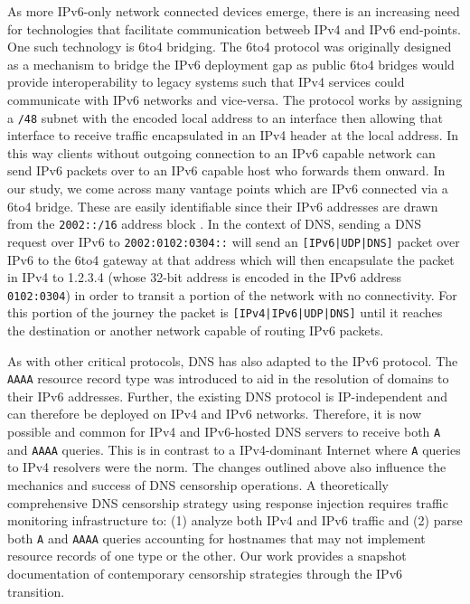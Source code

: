 As more IPv6-only network connected devices emerge, there is an increasing need
for technologies that facilitate communication betweeb IPv4 and IPv6
end-points. One such technology is 6to4 bridging. The 6to4 protocol was
originally designed as a mechanism to bridge the IPv6 deployment gap as public
6to4 bridges would provide interoperability to legacy systems such that IPv4
services could communicate with IPv6 networks and vice-versa. The protocol
works by assigning a \texttt{/48} subnet with the encoded local address to an
interface then allowing that interface to receive traffic encapsulated in an
IPv4 header at the local address. In this way clients without outgoing
connection to an IPv6 capable network can send IPv6 packets over to an IPv6
capable host who forwards them onward. In our study, we come across many
vantage points which are IPv6 connected via a 6to4 bridge. These are easily
identifiable since their IPv6 addresses are drawn from the \texttt{2002::/16}
address block \cite{RFC3056}.
%
In the context of DNS, sending a DNS request over IPv6 to
\texttt{2002:0102:0304::} will send an \texttt{[IPv6|UDP|DNS]} packet over IPv6
to the 6to4 gateway at that address which will then encapsulate the packet in
IPv4 to 1.2.3.4 (whose 32-bit address is encoded in the IPv6 address
\texttt{0102:0304}) in order to transit a portion of the network with no
connectivity. For this portion of the journey the packet is
\texttt{[IPv4|IPv6|UDP|DNS]} until it reaches the destination or another
network capable of routing IPv6 packets.


As with other critical protocols, DNS has also adapted to the IPv6 protocol.
The {\tt AAAA} resource record type was introduced to aid in the resolution of
domains to their IPv6 addresses. Further, the existing DNS protocol is
IP-independent and can therefore be deployed on IPv4 and IPv6 networks.
Therefore, it is now possible and common for IPv4 and IPv6-hosted DNS servers
to receive both {\tt A} and {\tt AAAA} queries. This is in contrast to
a IPv4-dominant Internet where {\tt A} queries to IPv4 resolvers were the norm.
The changes outlined above also influence the mechanics and success of DNS
censorship operations. A theoretically comprehensive DNS censorship strategy
using response injection requires traffic monitoring infrastructure to: (1)
analyze both IPv4 and IPv6 traffic and (2) parse both \texttt{A} and
\texttt{AAAA} queries accounting for hostnames that may not implement resource
records of one type or the other. 
%
Our work provides a snapshot documentation of contemporary
censorship strategies through the IPv6 transition.


